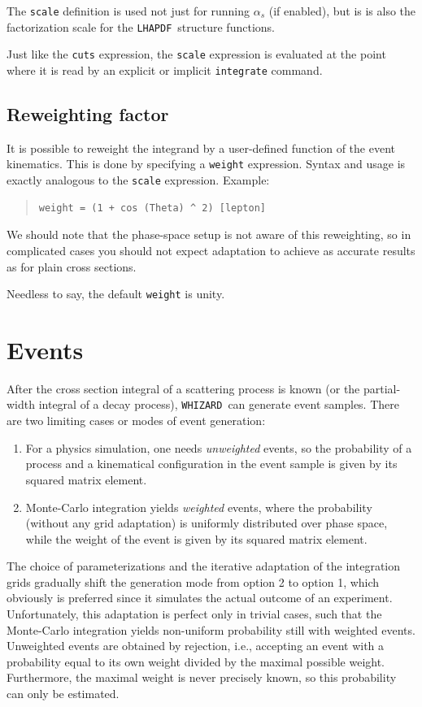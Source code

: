\documentclass[12pt]{book}
\newcommand{\ttt}[1]{\texttt{#1}}
\newcommand{\whizard}{\texttt{WHIZARD}}
\newcommand{\lhapdf}{\texttt{LHAPDF}}
\begin{document}
The \ttt{scale} definition is used not just for running $\alpha_s$ (if
enabled), but is is also the factorization scale for the \lhapdf\ structure
functions.

Just like the \ttt{cuts} expression, the \ttt{scale} expression is evaluated
at the point where it is read by an explicit or implicit \ttt{integrate}
command.


\subsection{Reweighting factor}

It is possible to reweight the integrand by a user-defined function of the
event kinematics.  This is done by specifying a \ttt{weight} expression.
Syntax and usage is exactly analogous to the \ttt{scale} expression.  Example:
\begin{quote}
\begin{footnotesize}
\begin{verbatim}
weight = (1 + cos (Theta) ^ 2) [lepton]
\end{verbatim}
\end{footnotesize}
\end{quote}
We should note that the phase-space setup is not aware of this reweighting, so
in complicated cases you should not expect adaptation to achieve as accurate
results as for plain cross sections.

Needless to say, the default \ttt{weight} is unity.


\section{Events}

After the cross section integral of a scattering process is known (or the
partial-width integral of a decay process), \whizard\ can generate event
samples.  There are two limiting cases or modes of event generation:
\begin{enumerate}
\item 
  For a physics simulation, one needs \emph{unweighted} events, so the
  probability of a process and a kinematical configuration in the event sample
  is given by its squared matrix element.
\item
  Monte-Carlo integration yields \emph{weighted} events, where the probability
  (without any grid adaptation) is uniformly distributed over phase space,
  while the weight of the event is given by its squared matrix element.
\end{enumerate}
The choice of parameterizations and the iterative adaptation of the
integration grids gradually shift the generation mode from option 2 to option
1, which obviously is preferred since it simulates the actual outcome of an
experiment.  Unfortunately, this adaptation is perfect only in trivial cases,
such that the Monte-Carlo integration yields non-uniform probability still
with weighted events.  Unweighted events are obtained by rejection, i.e.,
accepting an event with a probability equal to its own weight divided by the
maximal possible weight.  Furthermore, the maximal weight is never precisely
known, so this probability can only be estimated.
\end{document}

